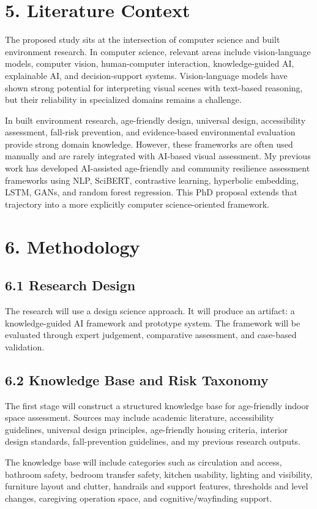 \documentclass[11pt,a4paper]{article}
\begin{document}
\section*{5. Literature Context}
The proposed study sits at the intersection of computer science and built environment research. In computer science, relevant areas include vision-language models, computer vision, human-computer interaction, knowledge-guided AI, explainable AI, and decision-support systems. Vision-language models have shown strong potential for interpreting visual scenes with text-based reasoning, but their reliability in specialized domains remains a challenge.

In built environment research, age-friendly design, universal design, accessibility assessment, fall-risk prevention, and evidence-based environmental evaluation provide strong domain knowledge. However, these frameworks are often used manually and are rarely integrated with AI-based visual assessment. My previous work has developed AI-assisted age-friendly and community resilience assessment frameworks using NLP, SciBERT, contrastive learning, hyperbolic embedding, LSTM, GANs, and random forest regression. This PhD proposal extends that trajectory into a more explicitly computer science-oriented framework.

\section*{6. Methodology}
\subsection*{6.1 Research Design}
The research will use a design science approach. It will produce an artifact: a knowledge-guided AI framework and prototype system. The framework will be evaluated through expert judgement, comparative assessment, and case-based validation.

\subsection*{6.2 Knowledge Base and Risk Taxonomy}
The first stage will construct a structured knowledge base for age-friendly indoor space assessment. Sources may include academic literature, accessibility guidelines, universal design principles, age-friendly housing criteria, interior design standards, fall-prevention guidelines, and my previous research outputs.

The knowledge base will include categories such as circulation and access, bathroom safety, bedroom transfer safety, kitchen usability, lighting and visibility, furniture layout and clutter, handrails and support features, thresholds and level changes, caregiving operation space, and cognitive/wayfinding support.
\end{document}
